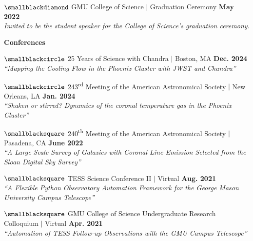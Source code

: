 \documentclass[marg, centered]{res}
\begin{document}
\begin{resume}
\begin{talks}[itemindent=0pt, leftmargin=19pt]
\item[\href{https://www.youtube.com/watch?v=xsyi9sqYH4o}{\color{dkbu}\small$\smallblackdiamond$}] GMU College of Science $|$ Graduation Ceremony \hfill \textbf{May 2022} \\
\textit{Invited to be the student speaker for the College of Science's graduation ceremony}.

\end{talks}

\textbf{Conferences}

\begin{talks}[itemindent=0pt, leftmargin=19pt]

\item[\href{https://cxc.cfa.harvard.edu/cdo/symposium_2024/schedule.html\#talk}{\color{dkbu}\small$\smallblackcircle$}] 25 Years of Science with Chandra $|$ Boston, MA \hfill \textbf{Dec. 2024} \\
\textit{``Mapping the Cooling Flow in the Phoenix Cluster with JWST and Chandra''} 

\item[\href{https://ui.adsabs.harvard.edu/abs/2024AAS...24344204R/abstract}{\color{dkbu}\small$\smallblackcircle$}] 243\textsuperscript{rd} Meeting of the American Astronomical Society $|$ New Orleans, LA \hfill \textbf{Jan. 2024} \\
\textit{``Shaken or stirred? Dynamics of the coronal temperature gas in the Phoenix Cluster''} 
    
\item[\href{https://ui.adsabs.harvard.edu/abs/2022AAS...24010113R/abstract}{\color{dkbu}\small$\smallblacksquare$}] 240\textsuperscript{th} Meeting of the American Astronomical Society $|$ Pasadena, CA \hfill \textbf{June 2022} \\
\textit{``A Large Scale Survey of Galaxies with Coronal Line Emission Selected from the Sloan Digital Sky Survey''}

\item[\href{https://zenodo.org/records/5114171}{\color{dkbu}\small$\smallblacksquare$}] TESS Science Conference II $|$ Virtual \hfill \textbf{Aug. 2021}\\
\textit{``A Flexible Python Observatory Automation Framework for the George Mason University Campus Telescope''}

\item[{\small$\smallblacksquare$}] GMU College of Science Undergraduate Research Colloquium $|$ Virtual \hfill \textbf{Apr. 2021}\\
\textit{``Automation of TESS Follow-up Observations with the GMU Campus Telescope''}


\end{talks}
\end{resume}
\end{document}
